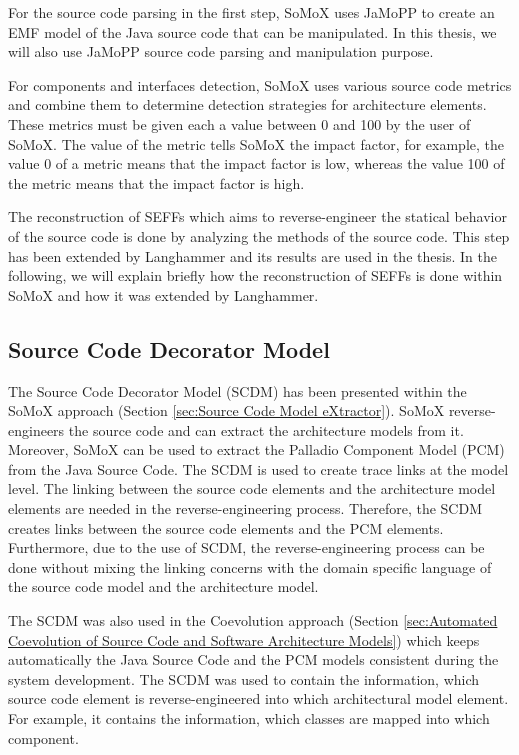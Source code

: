 For the source code parsing in the first step, SoMoX uses JaMoPP to create an EMF model of the Java source code that can be manipulated. In this thesis, we will also use JaMoPP source code parsing and manipulation purpose.

For components and interfaces detection, SoMoX uses various source code metrics and combine them to determine detection strategies for architecture elements. These metrics must be given each a value between 0 and 100 by the user of SoMoX. The value of the metric tells SoMoX the impact factor, for example, the value 0 of a metric means that the impact factor is low, whereas the value 100 of the metric means that the impact factor is high. 

The reconstruction of SEFFs which aims to reverse-engineer the statical behavior of the source code is done by analyzing the methods of the source code. This step has been extended by Langhammer \cite{langhammer2017automated} and its results are used in the thesis. In the following, we will explain briefly how the reconstruction of SEFFs is done within SoMoX and how it was extended by Langhammer.

\subsection{Source Code Decorator Model}
\label{sec:Source Code Decorator Model}

The Source Code Decorator Model (SCDM) has been presented within the SoMoX approach (Section \ref{sec:Source Code Model eXtractor}).  SoMoX reverse-engineers the source code and can extract the architecture models from it. Moreover, SoMoX can be used to extract the Palladio Component Model (PCM) from the Java Source Code. The SCDM is used to create trace links at the model level. The linking between the source code elements and the architecture model elements are needed in the reverse-engineering process. Therefore, the SCDM creates links between the source code elements and the PCM elements. Furthermore, due to the use of SCDM, the reverse-engineering process can be done without mixing the linking concerns with the domain specific language of the source code model and the architecture model.

The SCDM was also used in the Coevolution approach (Section \ref{sec:Automated Coevolution of Source Code and Software Architecture Models}) which keeps automatically the Java Source Code and the PCM models consistent during the system development. The SCDM was used to contain the information, which source code element is reverse-engineered into which architectural model element. For example, it contains the information, which classes are mapped into which component.

